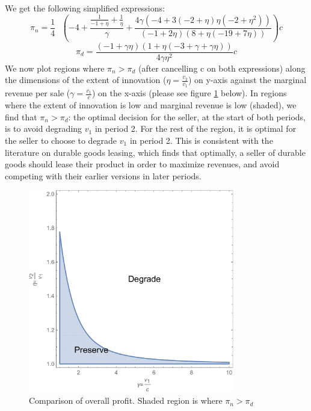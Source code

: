 \documentclass[isre,blindrev]{informs3} %
\begin{document}
We get the following simplified expressions:
\begin{equation}\label{pi_n_b1}
\pi _n=\frac{1}{4}\text{  }\left(-4+\frac{\frac{1}{-1+\eta }+\frac{1}{\eta }}{\gamma }+\frac{4 \gamma  \left(-4+3 (-2+\eta ) \eta  \left(-2+\eta
^2\right)\right)}{(-1+2 \eta ) (8+\eta  (-19+7 \eta ))}\right)c
\end{equation}
\begin{equation}\label{pi_d_b1}
\pi _d=\frac{(-1+\gamma  \eta ) (1+\eta  (-3+\gamma +\gamma  \eta ))}{4 \gamma  \eta ^2}c
\end{equation}
We now plot regions where \(\pi _n>\pi _d\) (after cancelling c on both expressions) along the dimensions of the extent of innovation (\(\eta  =\frac{v_2}{v_1}\))
on y-axis against the marginal revenue per sale (\(\gamma =\frac{v_1}{c}\)) on the x-axis (please see figure \ref{fig:fig4} below). In regions where the
extent of innovation is low and marginal revenue is low (shaded), we find that \(\pi _n>\pi _d\): the optimal decision for the seller, at the start
of both periods, is to avoid degrading \(v_1\) in period 2. For the rest of the region, it is optimal for the seller to choose to degrade \(v_1\)
in period 2. This is consistent with the literature on durable goods leasing, which finds that optimally, a seller of durable goods should lease
their product in order to maximize revenues, and avoid competing with their earlier versions in later periods.

\begin{figure}[htp]
    \centering
    \includegraphics[width=9cm]{2020_05_19-overleaf-mirror_gr4.pdf}
    \caption{Comparison of overall profit. Shaded region is where \(\pi _n>\pi _d\)}
    \label{fig:fig4}
\end{figure}
\end{document}

